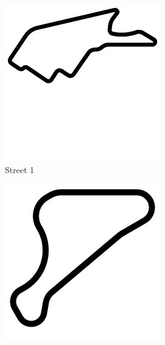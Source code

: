 \begin{figure}[t]
\centering
\begin{subfigure}[b]{0.15\textwidth}
       \includegraphics[width=\textwidth]{img/tracks/Street1}
       \caption{Street 1}
   \end{subfigure}
\begin{subfigure}[b]{0.16\textwidth}
       \includegraphics[width=\textwidth]{img/tracks/CG-Speedway}

\end{subfigure}
\end{figure}

